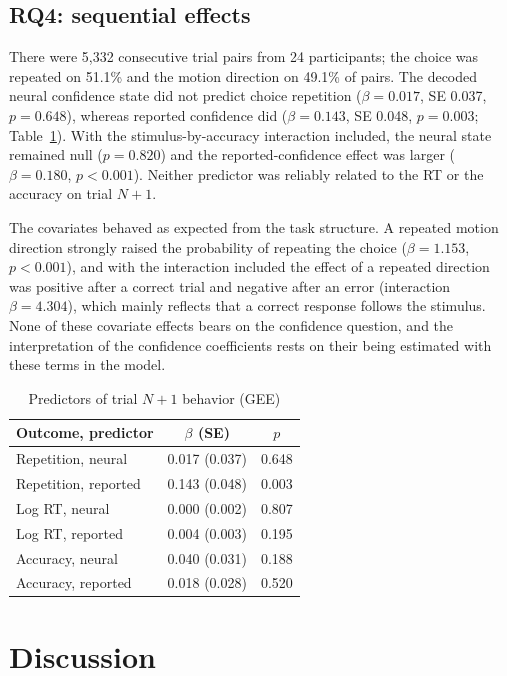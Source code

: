 \documentclass[11pt,a4paper]{article}
\begin{document}
\subsection{RQ4: sequential effects}

There were 5,332 consecutive trial pairs from 24 participants; the choice was repeated on 51.1\% and the motion direction on 49.1\% of pairs. The decoded neural confidence state did not predict choice repetition ($\beta=0.017$, SE 0.037, $p=0.648$), whereas reported confidence did ($\beta=0.143$, SE 0.048, $p=0.003$; Table~\ref{tab:gee}). With the stimulus-by-accuracy interaction included, the neural state remained null ($p=0.820$) and the reported-confidence effect was larger ($\beta=0.180$, $p<0.001$). Neither predictor was reliably related to the RT or the accuracy on trial $N{+}1$.

The covariates behaved as expected from the task structure. A repeated motion direction strongly raised the probability of repeating the choice ($\beta=1.153$, $p<0.001$), and with the interaction included the effect of a repeated direction was positive after a correct trial and negative after an error (interaction $\beta=4.304$), which mainly reflects that a correct response follows the stimulus. None of these covariate effects bears on the confidence question, and the interpretation of the confidence coefficients rests on their being estimated with these terms in the model.

\begin{table}[ht]
\centering
\caption{Predictors of trial $N{+}1$ behavior (GEE)}
\label{tab:gee}
\small
\begin{tabular}{@{}lcc@{}}
\toprule
\textbf{Outcome, predictor} & \textbf{$\beta$ (SE)} & \textbf{$p$}\\
\midrule
Repetition, neural & 0.017 (0.037) & 0.648\\
Repetition, reported & 0.143 (0.048) & 0.003\\
Log RT, neural & 0.000 (0.002) & 0.807\\
Log RT, reported & 0.004 (0.003) & 0.195\\
Accuracy, neural & 0.040 (0.031) & 0.188\\
Accuracy, reported & 0.018 (0.028) & 0.520\\
\bottomrule
\end{tabular}
\end{table}

\section{Discussion}
\end{document}

